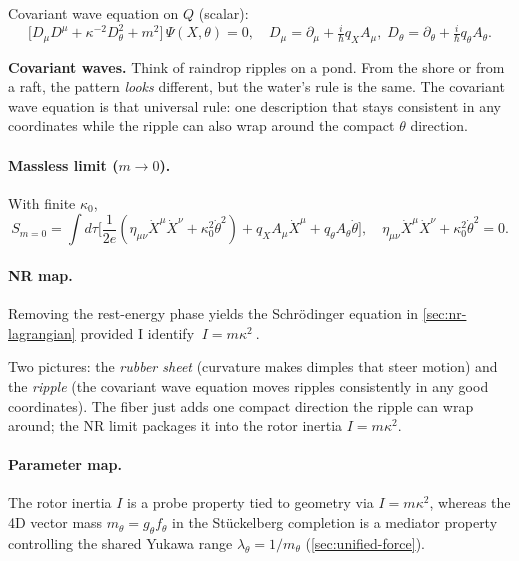 Covariant wave equation on $Q$ (scalar):
\begin{equation}
 \big[D_\mu D^\mu + \kappa^{-2} D_\theta^2 + m^2\big]\,\Psi(X,\theta)=0,\quad D_\mu=\partial_\mu+\tfrac{i}{\hbar}q_XA_\mu,\; D_\theta=\partial_\theta+\tfrac{i}{\hbar}q_\theta A_\theta.
\end{equation}

  \begin{idea}
  	  	\textbf{Covariant waves.} Think of raindrop ripples on a pond. From the shore or from a raft, the pattern \emph{looks} different, but the water’s rule is the same. The covariant wave equation is that universal rule: one description that stays consistent in any coordinates while the ripple can also wrap around the compact $\theta$ direction.
  \end{idea}

\paragraph{Massless limit (\texorpdfstring{$m\to 0$}{m->0}).} With finite $\kappa_0$,
\begin{equation}
 S_{m=0}=\int d\tau\Big[\frac{1}{2e}(\eta_{\mu\nu}\dot X^\mu\dot X^\nu+\kappa_0^2\dot\theta^2)+q_X A_\mu\dot X^\mu+q_\theta A_\theta\dot\theta\Big],\quad \eta_{\mu\nu}\dot X^\mu\dot X^\nu+\kappa_0^2\dot\theta^2=0.
\end{equation}

\paragraph{NR map.} Removing the rest-energy phase yields the Schr\"odinger equation in \cref{sec:nr-lagrangian} provided I identify $\boxed{\ I=m\kappa^2\ }$.

\begin{idea}
Two pictures: the \emph{rubber sheet} (curvature makes dimples that steer motion) and the \emph{ripple} (the covariant wave equation moves ripples consistently in any good coordinates). The fiber just adds one compact direction the ripple can wrap around; the NR limit packages it into the rotor inertia $I=m\kappa^2$.
\end{idea}

\paragraph{Parameter map.} The rotor inertia $I$ is a probe property tied to geometry via $I=m\kappa^2$, whereas the 4D vector mass $m_\theta=g_\theta f_\theta$ in the St\"uckelberg completion is a mediator property controlling the shared Yukawa range $\lambda_\theta=1/m_\theta$ (\cref{sec:unified-force}).

